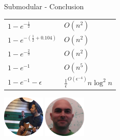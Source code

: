 \begin{frame}{Submodular - Conclusion}
    \begin{center}
        \Large
        \begin{tabular}{l l}
            \hline
            $1 - e^{-\frac{1}{2}}$ & $O(n^2)$
            \\
            \color{orange}$1 - e^{-(\frac{1}{2} + 0.104)}$ & \color{orange}$O(n^2)$
            \\
            \color{orange}$1 - e^{-\frac{2}{3}}$ & \color{orange}$O(n^2)$
            \\
            $1 - e^{-1}$ & $O(n^5)$
            \\
            $1 - e^{-1} - \epsilon$ & $\frac{1}{\epsilon}^{O(\epsilon^{-4})}n \log^2 n$
            \\
            \hline
        \end{tabular}
        
        \vfill
        
        \pause
        \includegraphics[height=2cm]{ariel.png}
        \includegraphics[height=2cm]{roy.png}
        
    \end{center}
\end{frame}
